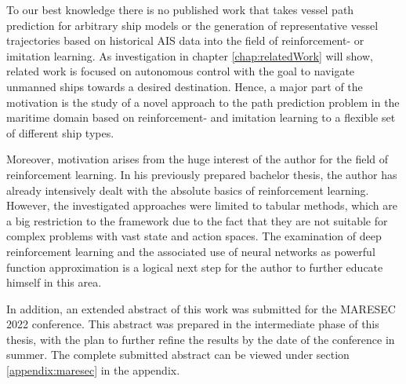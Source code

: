 To our best knowledge there is no published work that takes vessel path prediction for arbitrary ship models or the generation of representative vessel trajectories based on historical AIS data into the field of reinforcement- or imitation learning. As investigation in chapter \ref{chap:relatedWork} will show, related work is focused on autonomous control with the goal to navigate unmanned ships towards a desired destination. Hence, a major part of the motivation is the study of a novel approach to the path prediction problem in the maritime domain based on reinforcement- and imitation learning to a flexible set of different ship types.
\par
Moreover, motivation arises from the huge interest of the author for the field of reinforcement learning. In his previously prepared bachelor thesis, the author has already intensively dealt with the absolute basics of reinforcement learning.  However, the investigated approaches were limited to tabular methods, which are a big restriction to the framework due to the fact that they are not suitable for complex problems with vast state and action spaces. The examination of deep reinforcement learning and the associated use of neural networks as powerful function approximation is a logical next step for the author to further educate himself in this area.
\par
In addition, an extended abstract of this work was submitted for the MARESEC 2022 conference. This abstract was prepared in the intermediate phase of this thesis, with the plan to further refine the results by the date of the conference in summer. The complete submitted abstract can be viewed under section \ref{appendix:maresec} in the appendix.